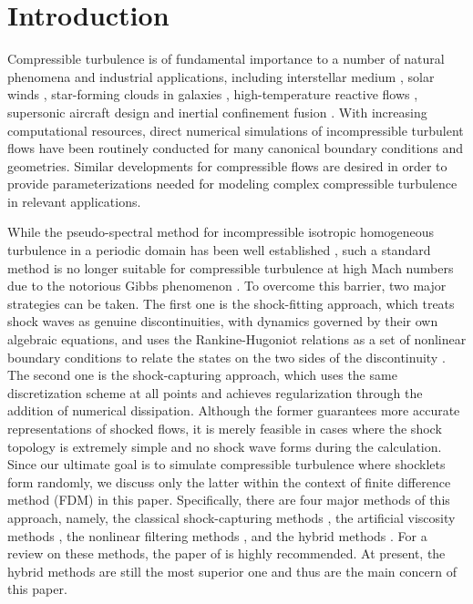 \documentclass[review]{elsarticle}
\begin{document}
\section{Introduction}\label{sec.1}

Compressible turbulence is of fundamental importance to a number of natural phenomena and industrial applications, including
interstellar medium \citep{Elmegreen2004, Scalo2004}, solar winds \citep{Alexandrova2013}, star-forming clouds in galaxies \citep{Mckee2007}, high-temperature reactive flows \citep{Pope1991}, supersonic aircraft design \citep{Ingenito2010} and inertial confinement fusion \citep{Lindl1998, He2016}. With increasing computational resources, direct numerical simulations of incompressible turbulent flows have been routinely conducted for many canonical boundary conditions and geometries. Similar developments for compressible flows are desired in order to provide parameterizations needed for modeling complex compressible turbulence in relevant applications.

While the pseudo-spectral method for incompressible isotropic homogeneous turbulence in a periodic domain has been well established \citep{Orszag1972}, such a standard method is no longer suitable for compressible turbulence at high Mach numbers due to the notorious Gibbs phenomenon \citep{Hewitt1979}. To overcome this barrier, two major strategies can be taken. The first one is the shock-fitting approach, which treats shock waves as genuine discontinuities, with dynamics governed by their own algebraic equations, and uses the Rankine-Hugoniot relations as a set of nonlinear boundary conditions to relate the states on the two sides of the discontinuity \citep{Moretti1987}. The second one is the shock-capturing approach, which uses the same discretization scheme at all points and achieves regularization through the addition of numerical dissipation. Although the former guarantees more accurate representations of shocked flows, it is merely feasible in cases where the shock topology is extremely simple and no shock wave forms during the calculation. Since our ultimate goal is to simulate compressible turbulence where shocklets form randomly, we discuss only the latter within the context of finite difference method (FDM) in this paper. Specifically, there are four major methods of this approach, namely, the classical shock-capturing methods \citep{Godunov1959, Leer1979, Colella1984, Toro2009, Courant1952, Harten1983, Harten1987, Liu1994}, the artificial viscosity methods \citep{Neumann1950, Jameson1981, Tadmor1989, Cook2004, Cook2005}, the nonlinear filtering methods \citep{Harten1978, Yee1999, Garnier2001, Yee2007}, and the hybrid methods \citep{Lee1997, Adams1996, Pirozzoli2002, Ren2003, Wang2010}. For a review on these methods, the paper of \citet{Pirozzoli2011} is highly recommended. At present, the hybrid methods are still the most superior one \citep{Johnsen2010} and thus are the main concern of this paper.
\end{document}
